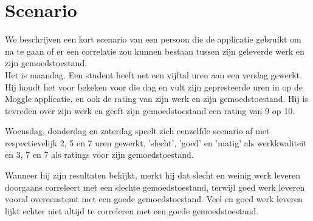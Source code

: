 \chapter{Scenario}\label{chapter:scenario}

We beschrijven een kort scenario van een persoon die de applicatie gebruikt om na te gaan of er een correlatie zou kunnen bestaan tussen zijn geleverde werk en zijn gemoedstoestand.\\


Het is maandag. Een student heeft net een vijftal uren aan een verslag gewerkt. Hij houdt het voor bekeken voor die dag en vult zijn gepresteerde uren in op de Moggle applicatie, en ook de rating van zijn werk en zijn gemoedstoestand. Hij is tevreden over zijn werk en geeft zijn gemoedstoestand een rating van 9 op 10.

Woensdag, donderdag en zaterdag speelt zich eenzelfde scenario af met respectievelijk 2, 5 en 7 uren gewerkt, 'slecht', 'goed' en 'matig' als werkkwaliteit en 3, 7 en 7 als ratings voor zijn gemoedstoestand.

Wanneer hij zijn resultaten bekijkt, merkt hij dat slecht en weinig werk leveren doorgaans correleert met een slechte gemoedstoestand, terwijl goed werk leveren vooral overeenstemt met een goede gemoedstoestand. Veel en goed werk leveren lijkt echter niet altijd te correleren met een goede gemoedstoestand.
